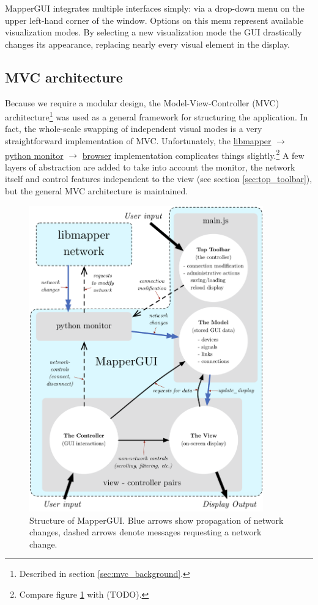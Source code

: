 MapperGUI integrates multiple interfaces simply: via a drop-down menu on the upper left-hand corner of the window. Options on this menu represent available visualization modes. By selecting a new visualization mode the GUI drastically changes its appearance, replacing nearly every visual element in the display.

	\subsection{MVC architecture} %
	\label{sec:mvc_architecture}

Because we require a modular design, the Model-View-Controller (MVC) architecture\footnote{Described in section \ref{sec:mvc_background}.} was used as a general framework for structuring the application. In fact, the whole-scale swapping of independent visual modes is a very straightforward implementation of MVC. Unfortunately, the \url{libmapper} $\rightarrow$ \url{python monitor} $\rightarrow$ \url{browser} implementation complicates things slightly.\footnote{Compare figure \ref{fig:mapper_network} with (TODO).} A few layers of abstraction are added to take into account the monitor, the network itself and control features independent to the view (see section \ref{sec:top_toolbar}), but the general MVC architecture is maintained.

\begin{figure}
\centering
	\includegraphics[width=0.9\textwidth]{figures/mapper_network}
\caption{Structure of MapperGUI. Blue arrows show propagation of network changes, dashed arrows denote messages requesting a network change.}
\label{fig:mapper_network}
\end{figure}


